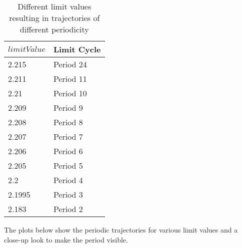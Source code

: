 \documentclass[main]{subfiles}
\begin{document}
\begin{table}[H]
\renewcommand{\arraystretch}{1.2}
\center
\begin{tabular}{@{}ll@{}}
	\toprule
   \(limitValue\) & Limit Cycle\\
   \midrule
   2.215 & Period 24 \\ 
   2.211 & Period 11 \\
   2.21  & Period 10 \\
   2.209 & Period 9 \\
   2.208 & Period 8 \\
   2.207 & Period 7 \\
   2.206 & Period 6 \\
   2.205 & Period 5 \\
   2.2 & Period 4 \\
   2.1995 & Period 3 \\
   2.183 & Period 2 \\
   \bottomrule
\end{tabular}
\caption{Different limit values resulting in trajectories of different periodicity}
\label{table:periodicities}
\end{table}


The plots below show the periodic trajectories for various limit values and a close-up look to make the period visible.
\end{document}
